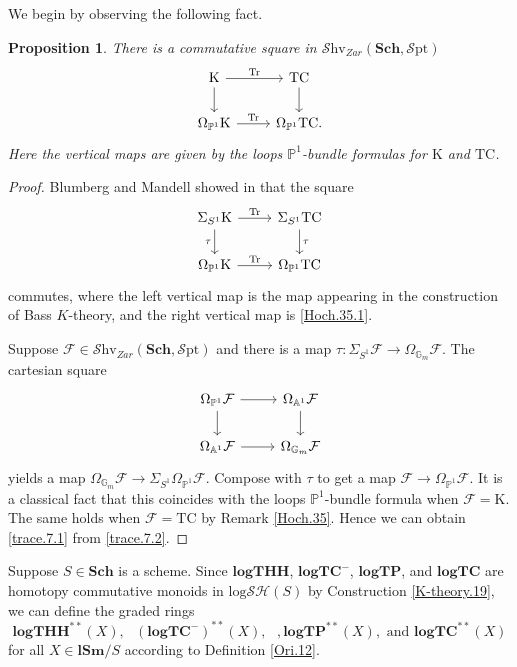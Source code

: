 \documentclass[11pt, a4paper]{amsart}
\newtheorem{prop}[thm]{Proposition}
\theoremstyle{definition}
\numberwithin{equation}{subsection}
\renewcommand{\P}{\mathbb{P}}
\newcommand{\A}{\mathbb{A}}
\newcommand{\G}{{\mathbb{G}}}
\newcommand{\Sch}{\mathbf{Sch}}
\newcommand{\lSm}{\mathbf{lSm}}
\newcommand{\TC}{\mathrm{TC}}
\newcommand{\Tr}{\mathrm{Tr}}
\newcommand{\Kth}{\mathrm{K}}
\newcommand{\spectlogTHH}{\mathbf{logTHH}}
\newcommand{\spectlogTC}{\mathbf{logTC}}
\newcommand{\spectlogTP}{\mathbf{logTP}}
\newcommand{\cF}{\mathcal{F}}
\newcommand{\infShv}{\mathcal{S}\mathrm{hv}}
\newcommand{\infSpt}{\mathcal{S}\mathrm{pt}}
\newcommand{\inflogSH}{\mathrm{log}\mathcal{SH}}
\begin{document}
We begin by observing the following fact. 
\begin{prop}
\label{trace.7}
There is a commutative square in $\infShv_{Zar}(\Sch,\infSpt)$
\begin{equation}
\label{trace.7.1}
\begin{tikzcd}
\Kth\ar[d]\ar[r,"\Tr"]&
\TC\ar[d]
\\
\Omega_{\P^1}\Kth\ar[r,"\Tr"]&
\Omega_{\P^1}\TC.
\end{tikzcd}
\end{equation}
Here the vertical maps are given by the loops $\P^1$-bundle formulas for $\Kth$ and $\TC$.
\end{prop}
\begin{proof}
Blumberg and Mandell showed in \cite[p.\ 1102]{BM12} that the square
\begin{equation}
\label{trace.7.2}
\begin{tikzcd}
\Sigma_{S^1}\Kth\ar[r,"\Tr"]\ar[d,"\tau"']&
\Sigma_{S^1}\TC\ar[d,"\tau"]
\\
\Omega_{\P^1}\Kth\ar[r,"\Tr"]&
\Omega_{\P^1}\TC
\end{tikzcd}
\end{equation}
commutes, where the left vertical map is the map appearing in the construction of Bass $K$-theory, 
and the right vertical map is \eqref{Hoch.35.1}.

Suppose $\cF\in \infShv_{Zar}(\Sch,\infSpt)$ and there is a map $\tau\colon \Sigma_{S^1}\cF\to \Omega_{\G_m}\cF$.
The cartesian square
\[
\begin{tikzcd}
\Omega_{\P^1}\cF\ar[d]\ar[r]&
\Omega_{\A^1}\cF\ar[d]
\\
\Omega_{\A^1}\cF\ar[r]&\Omega_{\G_m}\cF
\end{tikzcd}
\]
yields a map $\Omega_{\G_m}\cF\to \Sigma_{S^1}\Omega_{\P^1}\cF$.
Compose with $\tau$ to get a map $\cF\to \Omega_{\P^1}\cF$.
It is a classical fact that this coincides with the loops $\P^1$-bundle formula when $\cF=\Kth$.
The same holds when $\cF=\TC$ by Remark \ref{Hoch.35}.
Hence we can obtain \eqref{trace.7.1} from \eqref{trace.7.2}.
\end{proof}








Suppose $S\in \Sch$ is a scheme.
Since $\spectlogTHH$, $\spectlogTC^{-}$, $\spectlogTP$,
and $\spectlogTC$ are homotopy commutative monoids in $\inflogSH(S)$ by Construction \ref{K-theory.19}, 
we can define the graded rings
\[
\spectlogTHH^{**}(X),
\text{ }
(\spectlogTC^{-})^{**}(X),
\text{ },
\spectlogTP^{**}(X),
\text{ and }
\spectlogTC^{**}(X)
\]
for all $X\in \lSm/S$ according to Definition \ref{Ori.12}.
\end{document}
